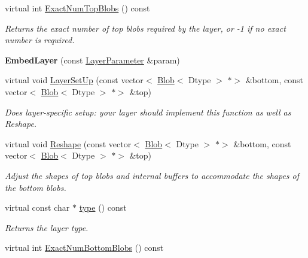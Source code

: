\begin{DoxyCompactItemize}
virtual int \mbox{\hyperlink{classcaffe_1_1_embed_layer_af02f4561fa25a979e523aae851bed39d}{Exact\+Num\+Top\+Blobs}} () const
\begin{DoxyCompactList}\small\item\em Returns the exact number of top blobs required by the layer, or -\/1 if no exact number is required. \end{DoxyCompactList}\item 
\mbox{\label{classcaffe_1_1_embed_layer_afbf978848b6e28d3fd549d780f5b82ae}} 
{\bfseries Embed\+Layer} (const \mbox{\hyperlink{classcaffe_1_1_layer_parameter}{Layer\+Parameter}} \&param)
\item 
virtual void \mbox{\hyperlink{classcaffe_1_1_embed_layer_a1fecd89c503b59a952f80ff61d4253b3}{Layer\+Set\+Up}} (const vector$<$ \mbox{\hyperlink{classcaffe_1_1_blob}{Blob}}$<$ Dtype $>$ $\ast$$>$ \&bottom, const vector$<$ \mbox{\hyperlink{classcaffe_1_1_blob}{Blob}}$<$ Dtype $>$ $\ast$$>$ \&top)
\begin{DoxyCompactList}\small\item\em Does layer-\/specific setup\+: your layer should implement this function as well as Reshape. \end{DoxyCompactList}\item 
virtual void \mbox{\hyperlink{classcaffe_1_1_embed_layer_ab388111d4ccdbcf081030ccd2e258f69}{Reshape}} (const vector$<$ \mbox{\hyperlink{classcaffe_1_1_blob}{Blob}}$<$ Dtype $>$ $\ast$$>$ \&bottom, const vector$<$ \mbox{\hyperlink{classcaffe_1_1_blob}{Blob}}$<$ Dtype $>$ $\ast$$>$ \&top)
\begin{DoxyCompactList}\small\item\em Adjust the shapes of top blobs and internal buffers to accommodate the shapes of the bottom blobs. \end{DoxyCompactList}\item 
\mbox{\label{classcaffe_1_1_embed_layer_adf4e7eb6e6fa3722ba00b877f43a96db}} 
virtual const char $\ast$ \mbox{\hyperlink{classcaffe_1_1_embed_layer_adf4e7eb6e6fa3722ba00b877f43a96db}{type}} () const
\begin{DoxyCompactList}\small\item\em Returns the layer type. \end{DoxyCompactList}\item 
virtual int \mbox{\hyperlink{classcaffe_1_1_embed_layer_a0634500a12e1d2299b7c8556976e4529}{Exact\+Num\+Bottom\+Blobs}} () const

\end{DoxyCompactItemize}
